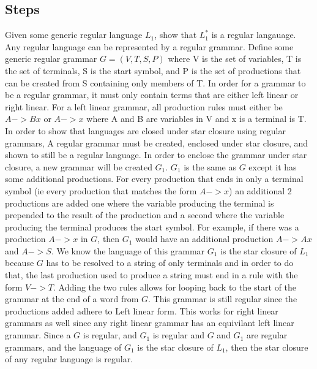 \documentclass{assignment-x}
\begin{document}
\subsection{Steps}
Given some generic regular language $L_1$, show that $L_1^*$ is a regular langauage.
Any regular language can be represented by a regular grammar.
Define some generic regular grammar $G  = (V,T,S,P)$ where V is the set of variables, T is the set of terminals, S is the start symbol, and P is the set of productions that can be created from S containing only members of T.
In order for a grammar to be a regular grammar, it must only contain terms that are either left linear or right linear. For a left linear grammar, all production rules must either be $A -> Bx$ or $A->x$ where A and B are variables in V and x is a terminal is T.
In order to show that languages are closed under star closure using regular grammars, A regular grammar must be created, enclosed under star closure, and shown to still be a regular language.
In order to enclose the grammar under star closure, a new grammar will be created $G_1$. 
$G_1$ is the same as $G$ except it has some additional productions. For every production that ends in only a terminal symbol (ie every production that matches the form $A -> x$) an additional 2 productions are added one where the variable producing the terminal is prepended to the result of the production and a second where the variable producing the terminal produces the start symbol. 
For example, if there was a production $A -> x$  in $G$, then $G_1$ would have an additional production $A -> Ax$ and $A -> S$.
We know the language of this grammar $G_1$ is the star closure of $L_1$ because $G$ has to be resolved to a string of only terminals and in order to do that, the last production used to produce a string must end in a rule with the form $V->T$. Adding the two rules allows for looping back to the start of the grammar at the end of a word from $G$.
This grammar is still regular since the productions added adhere to Left linear form.
This works for right linear grammars as well since any right linear grammar has an equivilant left linear grammar.
Since a $G$ is regular, and $G_1$ is regular and $G$ and $G_1$ are regular grammars, and the language of $G_1$ is the star closure of $L_1$, then the star closure of any regular language is regular.
\end{document}
